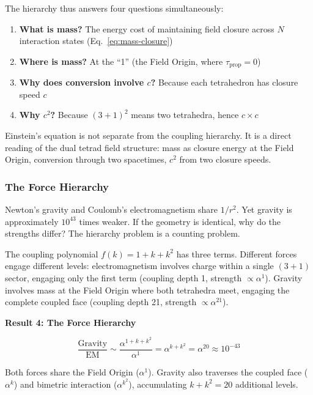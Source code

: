 \documentclass[aps,prd,preprint,superscriptaddress,showpacs,preprintnumbers,amsmath,amssymb,nofootinbib]{revtex4-2}
\begin{document}
The hierarchy thus answers four questions simultaneously:
\begin{enumerate}
\item \textbf{What is mass?} The energy cost of maintaining field closure across $N$ interaction states (Eq.~\ref{eq:mass-closure})
\item \textbf{Where is mass?} At the ``1'' (the Field Origin, where $\tau_{\text{prop}} = 0$)
\item \textbf{Why does conversion involve $c$?} Because each tetrahedron has closure speed $c$
\item \textbf{Why $c^2$?} Because $(3+1)^2$ means two tetrahedra, hence $c \times c$
\end{enumerate}

Einstein's equation is not separate from the coupling hierarchy. It is a direct reading of the dual tetrad field structure: mass as closure energy at the Field Origin, conversion through two spacetimes, $c^2$ from two closure speeds.

\subsubsection*{The Force Hierarchy}

Newton's gravity and Coulomb's electromagnetism share $1/r^2$. Yet gravity is approximately $10^{43}$ times weaker. If the geometry is identical, why do the strengths differ? The hierarchy problem is a counting problem.

The coupling polynomial $f(k) = 1 + k + k^2$ has three terms. Different forces engage different levels: electromagnetism involves charge within a single $(3{+}1)$ sector, engaging only the first term (coupling depth 1, strength $\propto \alpha^1$). Gravity involves mass at the Field Origin where both tetrahedra meet, engaging the complete coupled face (coupling depth 21, strength $\propto \alpha^{21}$).

\vspace{1.5em}
\noindent
\colorbox{resultgreen}{\parbox{\dimexpr\textwidth-2\fboxsep\relax}{%
\vspace{0.8em}
\centering
\textbf{\large Result 4: The Force Hierarchy}

\vspace{0.5em}
\boldmath
\begin{equation}
\frac{\text{Gravity}}{\text{EM}} \sim \frac{\alpha^{1+k+k^2}}{\alpha^{1}} = \alpha^{k+k^2} = \alpha^{20} \approx 10^{-43}
\label{eq:force-hierarchy}
\end{equation}
\unboldmath

\vspace{0.3em}
Both forces share the Field Origin ($\alpha^1$). Gravity also traverses the coupled face ($\alpha^k$) and bimetric interaction ($\alpha^{k^2}$), accumulating $k + k^2 = 20$ additional levels.
\vspace{0.5em}
}}
\vspace{1cm}
\end{document}
